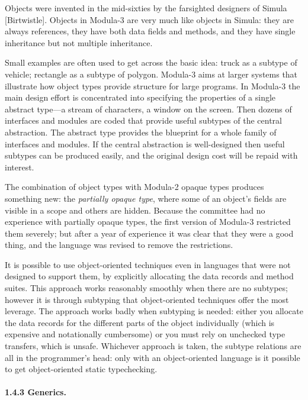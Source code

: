 \documentclass[10pt]{article}
\begin{document}
Objects were invented in the mid-sixties by the farsighted designers of Simula
[Birtwistle].  Objects in Modula-3 are very much like objects in Simula: they
are always references, they have both data fields and methods, and they have
single inheritance but not multiple inheritance.

Small examples are often used to get across the basic idea: truck as a subtype
of vehicle; rectangle as a subtype of polygon.  Modula-3 aims at larger
systems that illustrate how object types provide structure for large programs.
In Modula-3 the main design effort is concentrated into specifying the
properties of a single abstract type---a stream of characters, a window on the
screen.  Then dozens of interfaces and modules are coded that provide useful
subtypes of the central abstraction.  The abstract type provides the blueprint
for a whole family of interfaces and modules.  If the central abstraction is
well-designed then useful subtypes can be produced easily, and the original
design cost will be repaid with interest.

The combination of object types with Modula-2 opaque types produces something
new: the \emph{partially opaque type}, where some of an object's fields are
visible in a scope and others are hidden.  Because the committee had no
experience with partially opaque types, the first version of Modula-3
restricted them severely; but after a year of experience it was clear that
they were a good thing, and the language was revised to remove the
restrictions.

It is possible to use object-oriented techniques even in languages that were
not designed to support them, by explicitly allocating the data records and
method suites.  This approach works reasonably smoothly when there are no
subtypes; however it is through subtyping that object-oriented techniques
offer the most leverage.  The approach works badly when subtyping is needed:
either you allocate the data records for the different parts of the object
individually (which is expensive and notationally cumbersome) or you must rely
on unchecked type transfers, which is unsafe.  Whichever approach is taken,
the subtype relations are all in the programmer's head: only with an
object-oriented language is it possible to get object-oriented static
typechecking.

\paragraph{1.4.3 Generics.}
\end{document}
